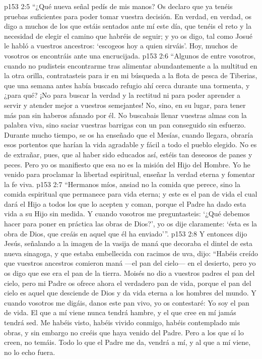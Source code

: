 \vs p153 2:5 “¿Qué nueva señal pedís de mis manos? Os declaro que ya tenéis pruebas suficientes para poder tomar vuestra decisión. En verdad, en verdad, os digo a muchos de los que estáis sentados ante mí este día, que tenéis el reto y la necesidad de elegir el camino que habréis de seguir; y yo os digo, tal como Josué le habló a vuestros ancestros: ‘escogeos hoy a quien sirváis’. Hoy, muchos de vosotros os encontráis ante una encrucijada.
\vs p153 2:6 “Algunos de entre vosotros, cuando no pudisteis encontrarme tras alimentar abundantemente a la multitud en la otra orilla, contratasteis para ir en mi búsqueda a la flota de pesca de Tiberias, que una semana antes había buscado refugio ahí cerca durante una tormenta, y ¿para qué? ¡No para buscar la verdad y la rectitud ni para poder aprender a servir y atender mejor a vuestros semejantes! No, sino, en su lugar, para tener más pan sin haberos afanado por él. No buscabais llenar vuestras almas con la palabra viva, sino saciar vuestras barrigas con un pan conseguido sin esfuerzo. Durante mucho tiempo, se os ha enseñado que el Mesías, cuando llegara, obraría esos portentos que harían la vida agradable y fácil a todo el pueblo elegido. No es de extrañar, pues, que al haber sido educados así, estéis tan deseosos de panes y peces. Pero yo os manifiesto que esa no es la misión del Hijo del Hombre. Yo he venido para proclamar la libertad espiritual, enseñar la verdad eterna y fomentar la fe viva.
\vs p153 2:7 “Hermanos míos, ansiad no la comida que perece, sino la comida espiritual que permanece para vida eterna; y este es el pan de vida el cual dará el Hijo a todos los que lo acepten y coman, porque el Padre ha dado esta vida a su Hijo sin medida. Y cuando vosotros me preguntasteis: ‘¿Qué debemos hacer para poner en práctica las obras de Dios?’, yo os dije claramente: ‘ésta es la obra de Dios, que creáis en aquel que él ha enviado’”.
\vs p153 2:8 Y entonces dijo Jesús, señalando a la imagen de la vasija de maná que decoraba el dintel de esta nueva sinagoga, y que estaba embellecida con racimos de uva, dijo: “Habéis creído que vuestros ancestros comieron maná ---el pan del cielo--- en el desierto, pero yo os digo que ese era el pan de la tierra. Moisés no dio a vuestros padres el pan del cielo, pero mi Padre os ofrece ahora el verdadero pan de vida, porque el pan del cielo es aquel que desciende de Dios y da vida eterna a los hombres del mundo. Y cuando vosotros me digáis, danos este pan vivo, yo os contestaré: Yo soy el pan de vida. El que a mí viene nunca tendrá hambre, y el que cree en mí jamás tendrá sed. Me habéis visto, habéis vivido conmigo, habéis contemplado mis obras, y sin embargo no creéis que haya venido del Padre. Pero a los que sí lo creen, no temáis. Todo lo que el Padre me da, vendrá a mí, y al que a mí viene, no lo echo fuera.
